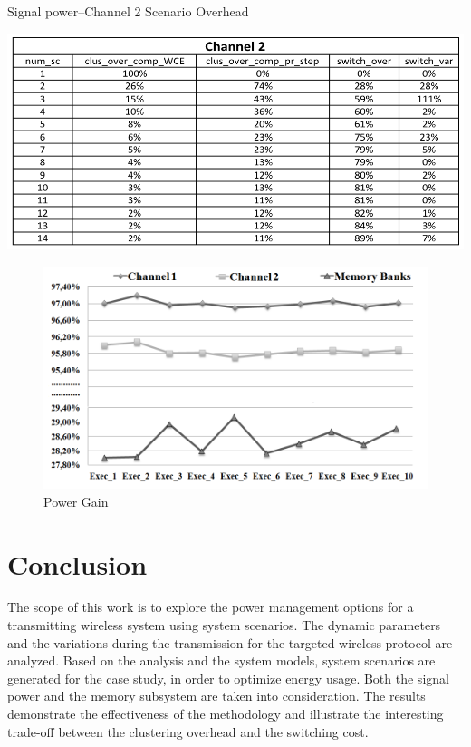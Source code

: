 \begin{table}
\centering
	\caption{Signal power–Channel 2 Scenario Overhead}
	\label{tab:F3}
	\includegraphics[width=\textwidth]{F/tab3.png}
\end{table} 

\begin{figure}
\centering
\includegraphics[width=\textwidth]{F/image15.png}
\caption{Power Gain}
\label{fig:F8}
\end{figure}	 

\section{Conclusion} 

The scope of this work is to explore the power management options for a transmitting wireless system using system scenarios. The dynamic parameters and the variations during the transmission for the targeted wireless protocol are analyzed. Based on the analysis and the system models, system scenarios are generated for the case study, in order to optimize energy usage. Both the signal power and the memory subsystem are taken into consideration. The results demonstrate the effectiveness of the methodology and illustrate the interesting trade-off between the clustering overhead and the switching cost. 
	


	
	
